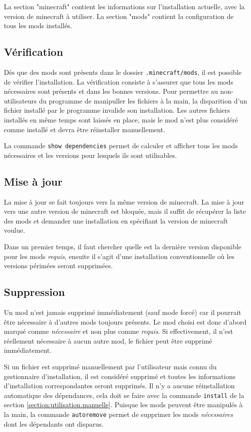 \documentclass{article}
\begin{document}
La section "minecraft" contient les informations sur l'installation actuelle, avec la version de minecraft à utiliser.
La section "mods" contient la configuration de tous les mods installés.


\subsection{Vérification}
Dès que des mods sont présents dans le dossier \texttt{.minecraft/mods}, il est possible de vérifier l'installation.
La vérification consiste à s'assurer que tous les mods nécessaires sont présents et dans les bonnes versions.
Pour permettre au non-utilisateurs du programme de manipuller les fichiers à la main, la disparition d'un fichier installé par le programme invalide son installation.
Les autres fichiers installés en même temps sont laissés en place, mais le mod n'est plus considéré comme installé et devra être réinstaller manuellement.

La commande \texttt{show dependencies} permet de calculer et afficher tous les mods nécessaires et les versions pour lesquels ils sont utilisables.

\subsection{Mise à jour}
\label{section:utilisation.miseajour}
La mise à jour se fait toujours vers la même version de minecraft.
La mise à jour vers une autre version de minecraft est bloquée, mais il suffit de récupérer la liste des mods et demander une installation en spécifiant la version de minecraft voulue.

Dans un premier temps, il faut chercher quelle est la dernière version disponible pour les mods \textit{requis}, ensuite il s'agit d'une installation conventionnelle où les versions périmées seront supprimées.

\subsection{Suppression}
Un mod n'est jamais supprimé immédiatement (sauf mode forcé) car il pourrait être nécessaire à d'autres mods toujours présents.
Le mod choisi est donc d'abord marqué comme \textit{nécessaire} et non plus comme \textit{requis}.
Si effectivement, il n'est réellement nécessaire à aucun autre mod, le fichier peut être supprimé immédiatement.

Si un fichier est supprimé manuellement par l'utilisateur mais connu du gestionnaire d'installation, il est considéré supprimé et toutes les informations d'installation correspondantes seront supprimés.
Il n'y a aucune réinstallation automatique des dépendances, cela doit se faire avec la commande \texttt{install} de la section \ref{section:utilisation.manuelle}.
Puisque les mods peuvent être manipulés à la main, la commande \texttt{autoremove} permet de supprimer les mods \textit{nécessaires} dont les dépendants ont disparus.
\end{document}
